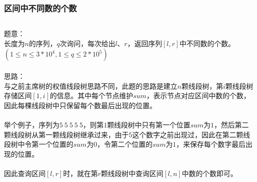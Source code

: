 \documentclass[twoside]{article}
\begin{document}
\subsubsection{区间中不同数的个数}
\begin{lstlisting}
\end{lstlisting}
题意：\\
长度为$n$的序列，$q$次询问，每次给出$l$、$r$，返回序列$[l,r]$中不同数的个数。$(1\leq n\leq 3*10^4,1\leq q\leq 2*10^5)$\\
\\
思路：\\
与之前主席树的权值线段树思路不同，此题的思路是建立$n$颗线段树，第$i$颗线段树存储区间$[1,i]$的信息。其中每个节点维护$sum$，表示节点对应区间中数的个数，因此每棵线段树中只保留每个数最后出现的位置。\\
\\
举个例子，序列为$5\ 5\ 5\ 5\ 5$，则第$1$颗线段树中只有第一个位置$sum$为$1$，然后第二颗线段树从第一颗线段树继承过来，由于$5$这个数字之前出现过，因此在第二颗线段树中令第一个位置的$sum$为$0$，令第二个位置的$sum$为$1$，来保存每个数字最后出现的位置。\\
\\
因此查询区间$[l,r]$时，就在第$r$颗线段树中查询区间$[l,n]$中数的个数即可。\\
\end{document}
